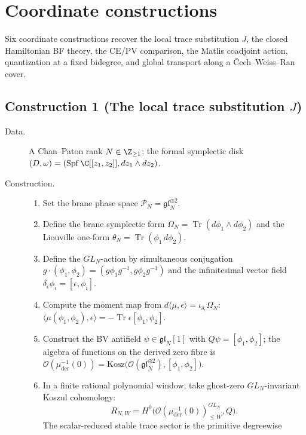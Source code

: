 \section{Coordinate constructions}\label{app:algorithms}

Six coordinate constructions recover the local trace substitution \(J\), the closed
Hamiltonian BF theory, the CE/PV comparison, the Matlis coadjoint
action, quantization at a fixed bidegree, and global transport along a
\v{C}ech--Weiss--Ran cover.

\subsection*{Construction 1 (The local trace substitution \(J\))}\label{algo:local-model}

\begin{description}
\item[Data.]  A Chan--Paton rank \(N\in\Z_{\ge 1}\); the formal
symplectic disk \((D,\omega)=(\mathrm{Spf}\,\C[[z_1,z_2]],dz_1\wedge dz_2)\).
\item[Construction.]
\begin{enumerate}
\item Set the brane phase space \(\mathcal P_N=\mathfrak{gl}_N^{\oplus 2}\).
\item Define the brane symplectic form
\(\Omega_N=\operatorname{Tr}(d\phi_1\wedge d\phi_2)\) and the
Liouville one-form \(\theta_N=\operatorname{Tr}(\phi_1\,d\phi_2)\).
\item Define the \(GL_N\)-action by simultaneous conjugation
\(g\cdot(\phi_1,\phi_2)=(g\phi_1g^{-1},g\phi_2g^{-1})\) and the
infinitesimal vector field \(\delta_\epsilon\phi_i=[\epsilon,\phi_i]\).
\item Compute the moment map from
\(d\langle\mu,\epsilon\rangle=\iota_{\delta_\epsilon}\Omega_N\):
\(\langle\mu(\phi_1,\phi_2),\epsilon\rangle
=-\operatorname{Tr}\epsilon[\phi_1,\phi_2]\).
\item Construct the BV antifield \(\psi\in\mathfrak{gl}_N[1]\) with
\(Q\psi=[\phi_1,\phi_2]\); the algebra of functions on the derived
zero fibre is
\(\mathcal O(\mu^{-1}_{\mathrm{der}}(0))=
\mathrm{Kosz}\bigl(\mathcal O(\mathfrak{gl}_N^{\oplus 2}),
[\phi_1,\phi_2]\bigr)\).
\item In a finite rational polynomial window, take ghost-zero
\(GL_N\)-invariant Koszul cohomology:
\[
  R_{N,W}
    =H^0\bigl(\mathcal O(\mu^{-1}_{\mathrm{der}}(0))_{\leq W}^{GL_N},Q\bigr).
\]
The scalar-reduced stable trace sector is the primitive degreewise

\end{enumerate}
\end{description}
